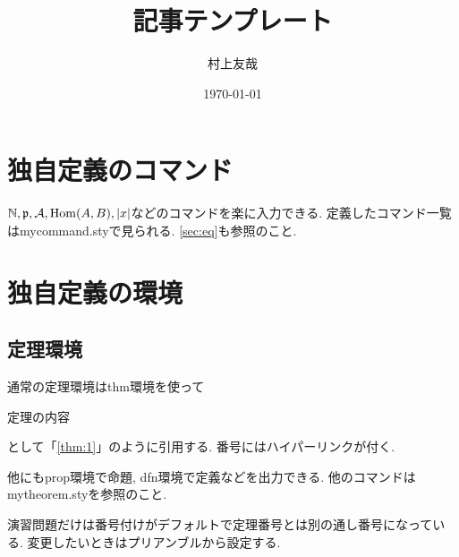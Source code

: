 \documentclass[11pt,a4paper,oneside,lualatex]{ltjsarticle} %
\numberwithin{equation}{section} %
\begin{document}

\title{記事テンプレート}
\author{村上友哉}
\date{\today}

\maketitle

\tableofcontents


\section{独自定義のコマンド} \label{sec:command}


$ \mathbb{N}, \mathfrak{p}, \mathcal{A}, \operatorname{Hom}(A, B), \left\lvert x\right\rvert $などのコマンドを楽に入力できる.
定義したコマンド一覧は\mbox{mycommand.sty}で見られる.
\cref{sec:eq}も参照のこと. 


\section{独自定義の環境} \label{sec:environment}



\subsection{定理環境} \label{subsec:thm}


通常の定理環境はthm環境を使って
\begin{thm}[見出し] \label{thm:1}
	定理の内容
\end{thm}
として「\cref{thm:1}」のように引用する.
番号にはハイパーリンクが付く.

他にもprop環境で命題, dfn環境で定義などを出力できる.
他のコマンドはmytheorem.styを参照のこと.

\begin{exc}
	演習問題だけは番号付けがデフォルトで定理番号とは別の通し番号になっている.
	変更したいときはプリアンブルから設定する.
\end{exc}
\end{document}
